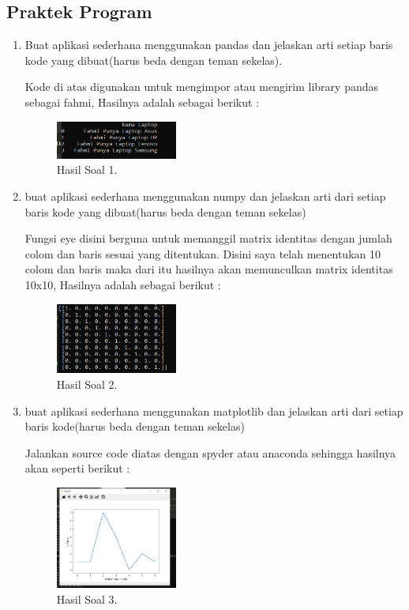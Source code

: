 \subsection{Praktek Program}
\begin{enumerate}
	\item Buat aplikasi sederhana menggunakan pandas dan jelaskan arti setiap baris kode yang dibuat(harus beda dengan teman sekelas).
	\hfill\break
	
	Kode di atas digunakan untuk mengimpor atau mengirim library pandas sebagai fahmi, Hasilnya adalah sebagai berikut :
	\begin{figure}[H]
	\centering
		\includegraphics[width=4cm]{figures/1174021/tugas3/materi/hasilsoal1.PNG}
		\caption{Hasil Soal 1.}
	\end{figure}

	\item buat aplikasi sederhana menggunakan numpy dan jelaskan arti dari setiap baris kode yang dibuat(harus beda dengan teman sekelas)
	\hfill\break
	
	Fungsi eye disini berguna untuk memanggil matrix identitas dengan jumlah colom dan baris sesuai yang ditentukan. Disini saya telah menentukan 10 colom dan baris maka dari itu hasilnya akan memunculkan matrix identitas 10x10, Hasilnya adalah sebagai berikut :
	\begin{figure}[H]
	\centering
		\includegraphics[width=4cm]{figures/1174021/tugas3/materi/hasilsoal2.PNG}
		\caption{Hasil Soal 2.}
	\end{figure}
	
	\item buat aplikasi sederhana menggunakan matplotlib dan jelaskan arti dari setiap baris kode(harus beda dengan teman sekelas)
	\hfill\break
	
	Jalankan source code diatas dengan spyder atau anaconda sehingga hasilnya akan seperti berikut : 

	\begin{figure}[H]
	\centering
		\includegraphics[width=4cm]{figures/1174021/tugas3/materi/hasilsoal3.PNG}
		\caption{Hasil Soal 3.}
	\end{figure}


\end{enumerate}
